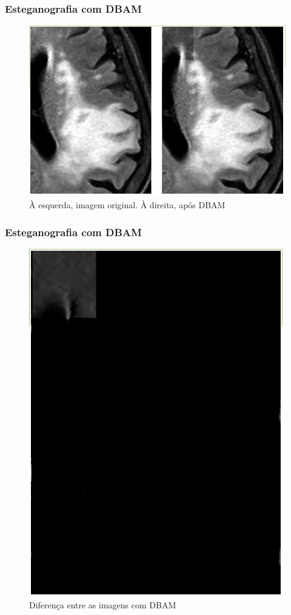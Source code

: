 \documentclass{beamer}
\begin{document}
\begin{frame}
\frametitle{Esteganografia com DBAM}
\begin{figure}
\includegraphics[scale=.2]{DBAM.png} 
\caption{À esquerda, imagem original. À direita, após DBAM}

\end{figure}
\end{frame}
\begin{frame}
\frametitle{Esteganografia com DBAM}
\begin{figure}
\includegraphics[scale=.2]{DBAMdiff.png} 
\caption{Diferença entre as imagens com DBAM}

\end{figure}
\end{frame}
\end{document}
